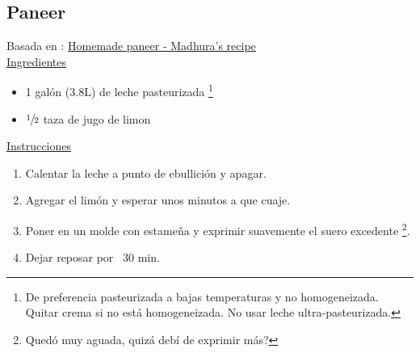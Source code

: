 \subsection{Paneer}

Basada en : \href{http://www.madhurasrecipe.com/veg/Homemade-Paneer}{Homemade paneer - Madhura's recipe} \\

\underline{Ingredientes}
\begin{itemize}
\item 1 gal\'on (3.8L) de leche pasteurizada \footnote{De preferencia pasteurizada a bajas temperaturas y no homogeneizada. Quitar crema si no está homogeneizada. No usar leche ultra-pasteurizada.}
\item $\sfrac{1}{2}$ taza de jugo de limon
\end{itemize}


\underline{Instrucciones}
\begin{enumerate}
\item Calentar la leche a punto de ebullición y apagar.
\item Agregar el limón y esperar unos minutos a que cuaje.
\item Poner en un molde con estame\~na y exprimir suavemente el suero excedente \footnote{Quedó muy aguada, quizá debí de exprimir más?}.
\item Dejar reposar por ~30 min.
\end{enumerate}
